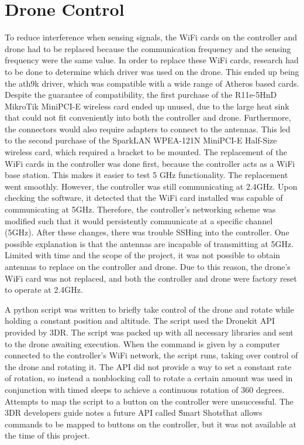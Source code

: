 \section{Drone Control}\label{results:drone_ctl}
To reduce interference when sensing signals, the WiFi cards on the controller and drone had to be replaced because the communication frequency and the sensing frequency were the same value. In order to replace these WiFi cards, research had to be done to determine which driver was used on the drone. This ended up being the ath9k driver, which was compatible with a wide range of Atheros based cards. Despite the guarantee of compatibility, the first purchase of the R11e-5HnD MikroTik MiniPCI-E wireless card ended up unused, due to the large heat sink that could not fit conveniently into both the controller and drone. Furthermore, the connectors would also require adapters to connect to the antennas. This led to the second purchase of the SparkLAN WPEA-121N MiniPCI-E Half-Size wireless card, which required a bracket to be mounted. The replacement of the WiFi cards in the controller was done first, because the controller acts as a WiFi base station. This makes it easier to test 5 GHz functionality. The replacement went smoothly. However, the controller was still communicating at 2.4GHz. Upon checking the software, it detected that the WiFi card installed was capable of communicating at 5GHz. Therefore, the controller's networking scheme was modified such that it would persistently communicate at a specific channel (5GHz). After these changes, there was trouble SSHing into the controller. One possible explanation is that the antennas are incapable of transmitting at 5GHz. Limited with time and the scope of the project, it was not possible to obtain antennas to replace on the controller and drone. Due to this reason, the drone's WiFi card was not replaced, and both the controller and drone were factory reset to operate at 2.4GHz. \par

A python script was written to briefly take control of the drone and rotate while holding a constant position and altitude. The script used the Dronekit API provided by 3DR. The script was packed up with all necessary libraries and sent to the drone awaiting execution. When the command is given by a computer connected to the controller's WiFi network, the script runs, taking over control of the drone and rotating it. The API did not provide a way to set a constant rate of rotation, so instead a nonblocking call to rotate a certain amount was used in conjunction with timed sleeps to achieve a continuous rotation of 360 degrees. Attempts to map the script to a button on the controller were unsuccessful. The 3DR developers guide notes a future API called \"Smart Shots\" that allows commands to be mapped to buttons on the controller, but it was not available at the time of this project.

